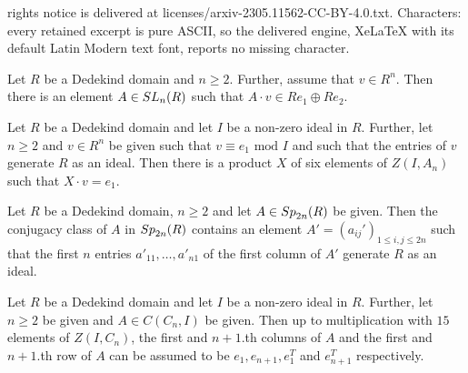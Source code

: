 \documentclass[10pt,a4paper]{amsart}
\begin{document}
rights notice is delivered at licenses/arxiv-2305.11562-CC-BY-4.0.txt. Characters: every retained excerpt is pure ASCII, so the delivered engine, XeLaTeX with its default Latin Modern text font, reports no missing character.
\begin{lemma}\label{stability_relative_ideal}
Let $R$ be a Dedekind domain and $n\geq 2.$ Further, assume that $v\in R^n$. Then there is an element $A\in{\rm SL}_n(R)$ such that $A\cdot v\in Re_1\oplus Re_2.$
\end{lemma}

\begin{lemma}\label{stability_sln_prep_step1}
Let $R$ be a Dedekind domain and let $I$ be a non-zero ideal in $R.$ Further, let $n\geq 2$ and $v\in R^n$ be given such that $v\equiv e_1\text{ mod }I$ and such that the entries of $v$ generate $R$ as an ideal. Then there is a product $X$ of six elements of $Z(I,A_n)$ such that $X\cdot v=e_1.$ 
\end{lemma}

\begin{lemma}\label{fixing_first_column_symplectic_step1}
Let $R$ be a Dedekind domain, $n\geq 2$ and let $A\in{\rm Sp}_{2n}(R)$ be given. Then the conjugacy class of $A$ in ${\rm Sp}_{2n}(R)$ contains an element $A'=(a_{ij}')_{1\leq i,j\leq 2n}$ such that the first $n$ entries $a'_{11},\dots,a'_{n1}$ of the first column of $A'$ generate $R$ as an ideal.  
\end{lemma}

\begin{lemma}\label{fixing_first_column_symplectic_step2}
Let $R$ be a Dedekind domain and let $I$ be a non-zero ideal in $R.$ Further, let $n\geq 2$ be given and $A\in C(C_n,I)$ be given. Then up to multiplication with $15$ elements of $Z(I,C_n)$, the first and $n+1.$th columns of $A$ and the first and $n+1$.th row of $A$ can be assumed to be $e_1, e_{n+1}, e_1^T$ and $e_{n+1}^T$ respectively. 
\end{lemma}
\end{document}
